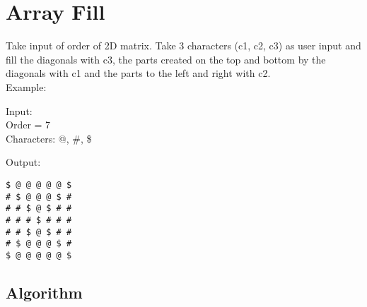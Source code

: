 \documentclass[ProgrammingAssignment.tex]{subfiles}
\begin{document}
\section{Array Fill}

Take input of order of 2D matrix. Take 3 characters (c1, c2, c3) as user input and fill the diagonals with c3, the parts created on the top and bottom by the diagonals with c1 and the parts to the left and right with c2.
\\ Example: 

Input:\\
Order = 7\\
Characters: @, \#, \$	

Output:
\begin{lstlisting}
$ @ @ @ @ @ $ 
# $ @ @ @ $ # 
# # $ @ $ # # 
# # # $ # # # 
# # $ @ $ # # 
# $ @ @ @ $ # 
$ @ @ @ @ @ $
\end{lstlisting}
\subsection{Algorithm}
\end{document}
